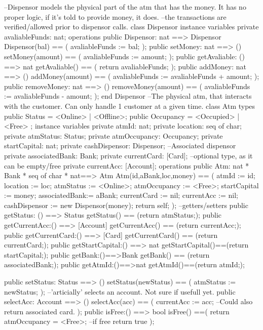 \documentclass[a4paper]{article}
\begin{document}
\title{}
\author{}
\begin{vdm_al}
--Dispensor models the physical part of the atm that has the money. It has no proper logic, if it's told to provide money, it does.
--the transactions are verified/allowed prior to dispensor calls.
class Dispensor 
instance variables
    private avaliableFunds: nat;
operations
    public Dispensor: nat ==> Dispensor
    Dispensor(bal) == (
        avaliableFunds := bal;
    );
    public setMoney: nat ==> ()
    setMoney(amount) == (
        avaliableFunds := amount;
    ); 
    public getAvaliable: () ==> nat
    getAvaliable() == (
        return avaliableFunds;
    );
    public addMoney: nat ==> () 
    addMoney(amount) == (
        avaliableFunds := avaliableFunds + amount;
    );
    public removeMoney: nat ==> ()
    removeMoney(amount) == (
        avaliableFunds := avaliableFunds - amount;
    );
end Dispensor
--The physical atm, that interacts with the customer. Can only handle 1 customer at a given time. 
class Atm
types
    public Status = <Online> | <Offline>;
    public Occupancy = <Occupied> | <Free> ;
instance variables
    private atmId: nat;
    private location: seq of char;
    private atmStatus: Status;
    private atmOccupancy: Occupancy;
    private startCapital: nat;
    private cashDispensor: Dispensor; --Associated dispensor
    private associatedBank: Bank;
    private currentCard: [Card]; --optional type, as it can be empty/free
    private currentAcc: [Account];
operations
    public Atm: nat * Bank * seq of char * nat==> Atm
    Atm(id,aBank,loc,money) == (
        atmId := id;
        location := loc;
        atmStatus := <Online>;
        atmOccupancy := <Free>;
        startCapital := money;
        associatedBank:= aBank;
        currentCard := nil;
        currentAcc := nil;
        cashDispensor := new Dispensor(money);
        return self;
    );
    --getters/setters
    public getStatus: () ==> Status
    getStatus() == (return atmStatus;);
    public getCurrentAcc:() ==> [Account]
    getCurrentAcc() == (return currentAcc;);
    public getCurrentCard:() ==> [Card]
    getCurrentCard() == (return currentCard;);
    public getStartCapital:() ==> nat
    getStartCapital()==(return startCapital;);
    public getBank:()==>Bank
    getBank() == (return associatedBank;);
    public getAtmId:()==>nat
    getAtmId()==(return atmId;);

    public setStatus: Status ==> ()
    setStatus(newStatus) == (
        atmStatus := newStatus;
    );
    --'articially' selects an account. Not sure if usefull yet. 
    public selectAcc: Account ==> ()
    selectAcc(acc) == (
        currentAcc := acc;
        --Could also return associated card.
    );
    public isFree:() ==> bool
    isFree() ==(
        return atmOccupancy = <Free>; --if free return true
    );


\end{vdm_al}
\end{document}
